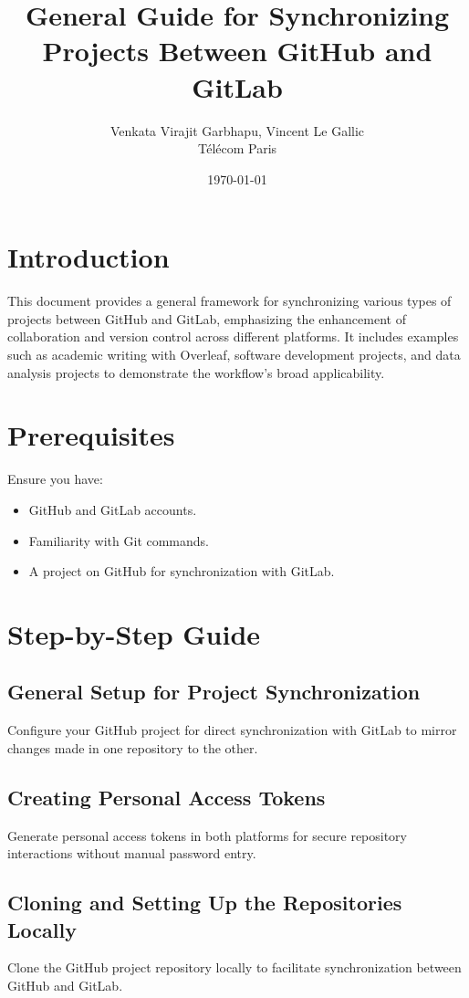 \documentclass[12pt]{article}
\title{\textbf{General Guide for Synchronizing Projects Between GitHub and GitLab}}
\author{Venkata Virajit Garbhapu, Vincent Le Gallic \\ Télécom Paris}
\date{\today}
\begin{document}
\maketitle

\section{Introduction}
This document provides a general framework for synchronizing various types of projects between GitHub and GitLab, emphasizing the enhancement of collaboration and version control across different platforms. It includes examples such as academic writing with Overleaf, software development projects, and data analysis projects to demonstrate the workflow's broad applicability.

\section{Prerequisites}
Ensure you have:
\begin{itemize}
  \item GitHub and GitLab accounts.
  \item Familiarity with Git commands.
  \item A project on GitHub for synchronization with GitLab.
\end{itemize}

\section{Step-by-Step Guide}

\subsection{General Setup for Project Synchronization}
Configure your GitHub project for direct synchronization with GitLab to mirror changes made in one repository to the other.

\subsection{Creating Personal Access Tokens}
Generate personal access tokens in both platforms for secure repository interactions without manual password entry.

\subsection{Cloning and Setting Up the Repositories Locally}
Clone the GitHub project repository locally to facilitate synchronization between GitHub and GitLab.
\end{document}
